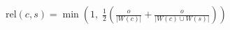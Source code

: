 \documentclass[border=3pt,varwidth=16cm]{standalone}
\begin{document}
$\displaystyle \mathrm{rel}(c, s) = \min\!\left(1,\; \frac{1}{2}\left(\frac{o}{|W(c)|} + \frac{o}{|W(c) \cup W(s)|}\right)\right)$
\end{document}
